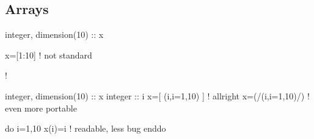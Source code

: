 \documentclass{article}
\begin{document}
\subsection{Arrays}
\label{sec:arrays}
\begin{codea}
integer, dimension(10) :: x

x=[1:10] ! not standard




!
\end{codea} 
\begin{codeb}
integer, dimension(10) :: x
integer :: i
x=[ (i,i=1,10) ] ! allright
x=(/(i,i=1,10)/) ! even more portable

do i=1,10
    x(i)=i ! readable, less bug
enddo
\end{codeb}


\end{document}
